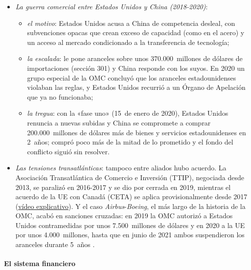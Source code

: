 \documentclass[11pt]{article}
\begin{document}
\begin{itemize}
\item \emph{La guerra comercial entre Estados Unidos y China (2018-2020)}:
  \begin{itemize}
  \item \emph{el motivo}: Estados Unidos acusa a China de competencia desleal, con subvenciones opacas que crean exceso de capacidad (como en el acero) y un acceso al mercado condicionado a la transferencia de tecnología;
  \item \emph{la escalada}: le pone aranceles sobre unos 370.000~millones de dólares de importaciones (sección 301) y China responde con los suyos. En 2020 un grupo especial de la OMC concluyó que los aranceles estadounidenses violaban las reglas, y Estados Unidos recurrió a un Órgano de Apelación que ya no funcionaba\nocite{Bown2026Chart,Fajgelbaum2020Proteccionismo,OMC2020DS543};
  \item \emph{la tregua}: con la «fase uno» (15~de enero de 2020), Estados Unidos renuncia a nuevas subidas y China se compromete a comprar 200.000~millones de dólares más de bienes y servicios estadounidenses en 2~años; compró poco más de la mitad de lo prometido y el fondo del conflicto siguió sin resolver\nocite{USTR2020FaseUno,Bown2022FaseUno}.
  \end{itemize}
\item \emph{Las tensiones transatlánticas}: tampoco entre aliados hubo acuerdo. La Asociación Transatlántica de Comercio e Inversión (TTIP), negociada desde 2013, se paralizó en 2016-2017 y se dio por cerrada en 2019, mientras el acuerdo de la UE con Canadá (CETA) se aplica provisionalmente desde 2017 (\href{https://youtu.be/xbKOvxIYpDc}{vídeo explicativo}). Y el caso \emph{Airbus}-\emph{Boeing}, el más largo de la historia de la OMC, acabó en sanciones cruzadas: en 2019 la OMC autorizó a Estados Unidos contramedidas por unos 7.500~millones de dólares y en 2020 a la UE por unos 4.000~millones, hasta que en junio de 2021 ambos suspendieron los aranceles durante 5~años .
\end{itemize}

\paragraph{El sistema financiero}
\end{document}
